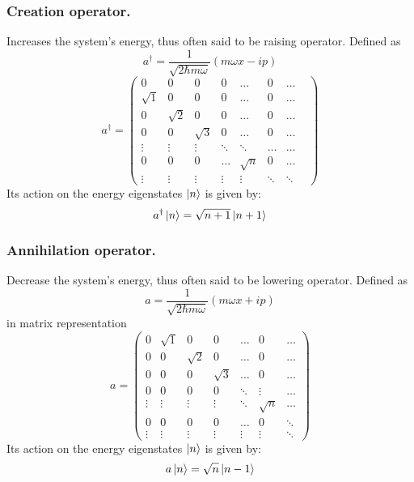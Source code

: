\documentclass[../../../main.tex]{subfiles}
\begin{document}
\subsubsection{Creation operator.} Increases the system's energy, thus often said to be raising operator. Defined as 
\begin{equation*}
    a^\dagger = \frac{1}{\sqrt{2\hbar m \omega}} \left( m\omega x - i p \right)
\end{equation*}
\begin{equation*}
    a^\dagger=\begin{pmatrix}
    0 & 0 & 0 & 0 & \dots & 0 & \dots \\
    \sqrt{1} & 0 & 0 & 0 & \dots & 0 & \dots \\
    0 & \sqrt{2} & 0 & 0 & \dots & 0 & \dots \\
    0 & 0 & \sqrt{3} & 0 & \dots & 0 & \dots \\
    \vdots & \vdots & \vdots & \ddots & \ddots & \dots & \dots \\
    0 & 0 & 0 & \dots & \sqrt{n} & 0 & \dots & \\
    \vdots & \vdots & \vdots & \vdots & \vdots & \ddots & \ddots 
\end{pmatrix}
\end{equation*}
Its action on the energy eigenstates $\ket{n}$ is given by:
\begin{equation*}
a^\dagger \ket{n} = \sqrt{n+1} \ket{n+1}
\end{equation*}

\subsubsection{Annihilation operator.} Decrease the system's energy, thus often said to be lowering operator. Defined as
\begin{equation*}
    a = \frac{1}{\sqrt{2\hbar m \omega}} \left( m\omega x + i p \right)
\end{equation*}
in matrix representation
\begin{equation*}
    a=\begin{pmatrix}
        0 & \sqrt{1} & 0 & 0 & \dots & 0 & \dots \\
        0 & 0 & \sqrt{2} & 0 & \dots & 0 & \dots \\
        0 & 0 & 0 & \sqrt{3} & \dots & 0 & \dots \\
        0 & 0 & 0 & 0 & \ddots & \vdots & \dots \\
        \vdots & \vdots & \vdots & \vdots & \ddots & \sqrt{n} & \dots \\
        0 & 0 & 0 & 0 & \dots & 0 & \ddots \\
        \vdots & \vdots & \vdots & \vdots & \vdots & \vdots & \ddots 
    \end{pmatrix}
\end{equation*}
Its action on the energy eigenstates $\ket{n}$ is given by:
\begin{equation*}
    a \ket{n} = \sqrt{n} \ket{n-1}
\end{equation*}
\end{document}
